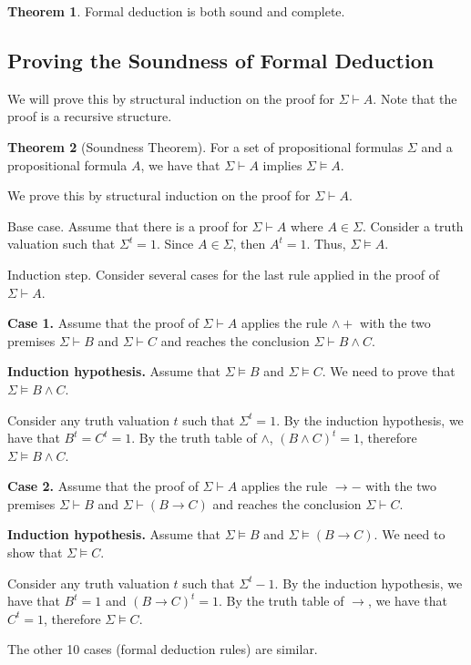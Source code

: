 \documentclass[11pt]{article}
\makeatletter
\theoremstyle{definition}
\newtheorem{thm}{Theorem}[section]
\newenvironment{pf}[1][\proofname]{\par
  \pushQED{\qed}%
  \normalfont \topsep0\p@\relax
  \trivlist
  \item[\hskip\labelsep\itshape
  #1\@addpunct{.}]\ignorespaces
}{%
  \popQED\endtrivlist\@endpefalse
}
\makeatother
\begin{document}
\begin{thm}
Formal deduction is both sound and complete.
\end{thm}

\subsection{Proving the Soundness of Formal Deduction}
We will prove this by structural induction on the proof for $\Sigma \vdash A$. Note that the proof is a recursive structure.

\begin{thm}[Soundness Theorem]
For a set of propositional formulas $\Sigma$ and a propositional formula $A$, we have that $\Sigma \vdash A$ implies $\Sigma \vDash A$.
\end{thm}
\begin{pf}
We prove this by structural induction on the proof for $\Sigma \vdash A$.

{\sc Base case.} Assume that there is a proof for $\Sigma \vdash A$ where $A \in \Sigma$. Consider a truth valuation such that $\Sigma^t = 1$. Since $A \in \Sigma$, then $A^t = 1$. Thus, $\Sigma \vDash A$.

{\sc Induction step.} Consider several cases for the last rule applied in the proof of $\Sigma \vdash A$.

{\bf Case 1.} Assume that the proof of $\Sigma \vdash A$ applies the rule $\wedge+$ with the two premises $\Sigma \vdash B$ and $\Sigma \vdash C$ and reaches the conclusion $\Sigma \vdash B \wedge C$.

{\bf Induction hypothesis.} Assume that $\Sigma \vDash B$ and $\Sigma \vDash C$. We need to prove that $\Sigma \vDash B \wedge C$.

Consider any truth valuation $t$ such that $\Sigma^t = 1$. By the induction hypothesis, we have that $B^t = C^t = 1$. By the truth table of $\wedge$, $(B \wedge C)^t = 1$, therefore $\Sigma \vDash B \wedge C$.

{\bf Case 2.} Assume that the proof of $\Sigma \vdash A$ applies the rule $\rightarrow-$ with the two premises $\Sigma \vdash B$ and $\Sigma \vdash (B \rightarrow C)$ and reaches the conclusion $\Sigma \vdash C$.

{\bf Induction hypothesis.} Assume that $\Sigma \vDash B$ and $\Sigma \vDash (B \rightarrow C)$. We need to show that $\Sigma \vDash C$.

Consider any truth valuation $t$ such that $\Sigma^t - 1$. By the induction hypothesis, we have that $B^t = 1$ and $(B \rightarrow C)^t = 1$. By the truth table of $\rightarrow$, we have that $C^t = 1$, therefore $\Sigma \vDash C$.

The other 10 cases (formal deduction rules) are similar.
\end{pf}
\end{document}
